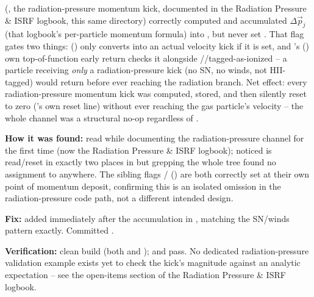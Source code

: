 (, the radiation-pressure
momentum kick, documented in the Radiation Pressure \& ISRF logbook,
this same directory) correctly computed
and accumulated $\Delta\vec p_j$ (that logbook's per-particle momentum
formula) into
, but never set
. That flag gates two
things: 
() only converts  into an actual
velocity kick if it is set, and
's ()
own top-of-function early return checks it alongside
//tagged-as-ionized -- a
particle receiving \emph{only} a radiation-pressure kick (no SN, no
winds, not HII-tagged) would return before ever reaching the radiation
branch. Net effect: every radiation-pressure momentum kick was
computed, stored, and then silently reset to zero
('s own reset line) without ever reaching the
gas particle's velocity -- the whole channel was a structural no-op
regardless of .

\textbf{How it was found:} read while documenting the radiation-pressure
channel for the first time (now the Radiation Pressure \& ISRF
logbook); noticed
 is read/reset in exactly two places in
 but grepping the whole  tree found
no assignment to  anywhere. The sibling flags
/
() are both
correctly set at their own point of momentum deposit, confirming this
is an isolated omission in the radiation-pressure code path, not a
different intended design.

\textbf{Fix:} added 
immediately after the  accumulation in
, matching the
SN/winds pattern exactly. Committed .

\textbf{Verification:} clean build (both  and
);  and
 pass. No dedicated
radiation-pressure validation example exists yet to check the kick's
magnitude against an analytic expectation -- see the open-items
section of the Radiation Pressure \& ISRF logbook.

